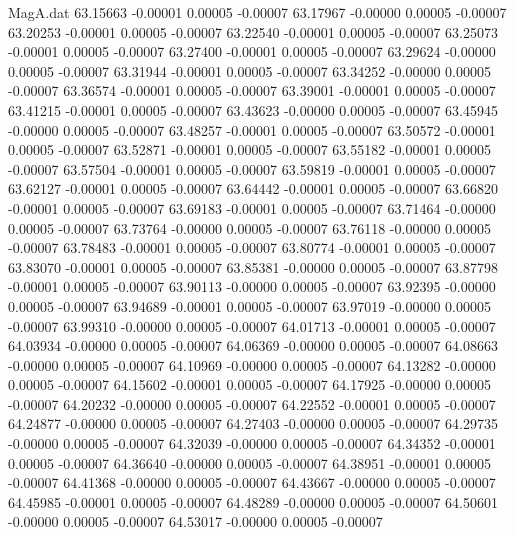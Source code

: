 \begin{filecontents}{MagA.dat}
  63.15663   -0.00001    0.00005   -0.00007
  63.17967   -0.00000    0.00005   -0.00007
  63.20253   -0.00001    0.00005   -0.00007
  63.22540   -0.00001    0.00005   -0.00007
  63.25073   -0.00001    0.00005   -0.00007
  63.27400   -0.00001    0.00005   -0.00007
  63.29624   -0.00000    0.00005   -0.00007
  63.31944   -0.00001    0.00005   -0.00007
  63.34252   -0.00000    0.00005   -0.00007
  63.36574   -0.00001    0.00005   -0.00007
  63.39001   -0.00001    0.00005   -0.00007
  63.41215   -0.00001    0.00005   -0.00007
  63.43623   -0.00000    0.00005   -0.00007
  63.45945   -0.00000    0.00005   -0.00007
  63.48257   -0.00001    0.00005   -0.00007
  63.50572   -0.00001    0.00005   -0.00007
  63.52871   -0.00001    0.00005   -0.00007
  63.55182   -0.00001    0.00005   -0.00007
  63.57504   -0.00001    0.00005   -0.00007
  63.59819   -0.00001    0.00005   -0.00007
  63.62127   -0.00001    0.00005   -0.00007
  63.64442   -0.00001    0.00005   -0.00007
  63.66820   -0.00001    0.00005   -0.00007
  63.69183   -0.00001    0.00005   -0.00007
  63.71464   -0.00000    0.00005   -0.00007
  63.73764   -0.00000    0.00005   -0.00007
  63.76118   -0.00000    0.00005   -0.00007
  63.78483   -0.00001    0.00005   -0.00007
  63.80774   -0.00001    0.00005   -0.00007
  63.83070   -0.00001    0.00005   -0.00007
  63.85381   -0.00000    0.00005   -0.00007
  63.87798   -0.00001    0.00005   -0.00007
  63.90113   -0.00000    0.00005   -0.00007
  63.92395   -0.00000    0.00005   -0.00007
  63.94689   -0.00001    0.00005   -0.00007
  63.97019   -0.00000    0.00005   -0.00007
  63.99310   -0.00000    0.00005   -0.00007
  64.01713   -0.00001    0.00005   -0.00007
  64.03934   -0.00000    0.00005   -0.00007
  64.06369   -0.00000    0.00005   -0.00007
  64.08663   -0.00000    0.00005   -0.00007
  64.10969   -0.00000    0.00005   -0.00007
  64.13282   -0.00000    0.00005   -0.00007
  64.15602   -0.00001    0.00005   -0.00007
  64.17925   -0.00000    0.00005   -0.00007
  64.20232   -0.00000    0.00005   -0.00007
  64.22552   -0.00001    0.00005   -0.00007
  64.24877   -0.00000    0.00005   -0.00007
  64.27403   -0.00000    0.00005   -0.00007
  64.29735   -0.00000    0.00005   -0.00007
  64.32039   -0.00000    0.00005   -0.00007
  64.34352   -0.00001    0.00005   -0.00007
  64.36640   -0.00000    0.00005   -0.00007
  64.38951   -0.00001    0.00005   -0.00007
  64.41368   -0.00000    0.00005   -0.00007
  64.43667   -0.00000    0.00005   -0.00007
  64.45985   -0.00001    0.00005   -0.00007
  64.48289   -0.00000    0.00005   -0.00007
  64.50601   -0.00000    0.00005   -0.00007
  64.53017   -0.00000    0.00005   -0.00007

\end{filecontents}

